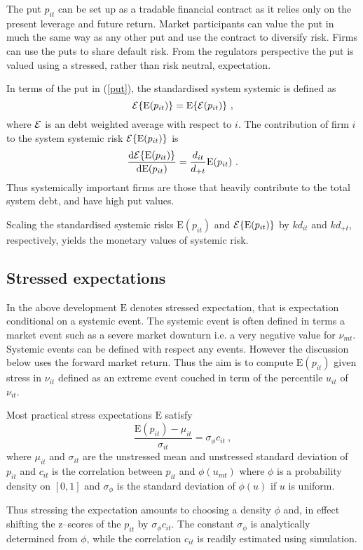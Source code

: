 \documentclass[authoryear]{elsarticle}
\newcommand{\E}{\mathrm{E}}
\newcommand{\Ex}{{\cal E}}
\newcommand{\de}{\mathrm{d}}
\newcommand{\eref}[1]{(\ref{#1})}
\newcommand{\be}[1]{\begin{equation}\label{#1}}
\newcommand{\ee}{\end{equation}}
\begin{document}
The put $p_{it}$ can be set up as a tradable financial contract as it relies only on the present leverage and future return.  Market participants can value the put in much the same way as any other put and use the contract to diversify risk.  Firms can use the puts to share default risk.    From the regulators perspective  the put is valued using a stressed, rather than risk neutral, expectation.

In terms of the put in \eref{put}, the standardised system systemic is defined as
\be{nsrisk}
\Ex\{\E(p_{it})\} = \E\{\Ex(p_{it})\}\ , 
\ee
where $\Ex$ is an debt weighted average with respect to $i$.  The contribution of firm $i$ to the system systemic risk $\Ex\{\E(p_{it})\}$ is  
$$
\frac{\de \Ex\{\E(p_{it})\} }{\de \E(p_{it}) } = \frac{d_{it}}{d_{+t}}\E(p_{it})\ .
$$
Thus systemically important firms are those that heavily contribute  to the total system debt, and have high put values.

Scaling the standardised systemic risks $\E(p_{it})$ and $\Ex\{\E(p_{it})\}$ by $kd_{it}$ and $kd_{+t}$, respectively, yields the monetary values of  systemic risk.

\subsection{Stressed expectations}

In the above development $\E$  denotes  stressed expectation, that is expectation conditional on a systemic event.   The systemic event is often defined in terms a market event such as a severe market downturn i.e. a very negative value for  $\nu_{mt}$.   Systemic events can be defined with respect any events.   However the discussion below uses the forward market return.  Thus the aim is to compute $\E(p_{it})$ given stress in $\nu_{it}$ defined as an extreme event couched in term of the percentile $u_{it}$ of $\nu_{it}$.

Most practical stress expectations $\E$ satisfy
\be{formula}
\frac{\E(p_{it})-\mu_{it}}{\sigma_{it}} =\sigma_\phi c_{it}\ ,
\ee
where $\mu_{it}$ and $\sigma_{it}$ are the unstressed mean and unstressed standard deviation of $p_{it}$ and $c_{it}$ is the correlation between $p_{it}$ and $\phi(u_{mt})$ where $\phi$ is a probability density on $[0,1]$ and  $\sigma_\phi$ is the standard deviation of $\phi(u)$ if  $u$ is uniform.     

Thus stressing the expectation amounts to choosing a density $\phi$ and, in effect shifting the z--scores of the $p_{it}$  
by  $\sigma_\phi c_{it}$.  The constant $\sigma_\phi$ is analytically determined from $\phi$, while the correlation $c_{it}$  is  readily estimated using simulation.  
\end{document}
